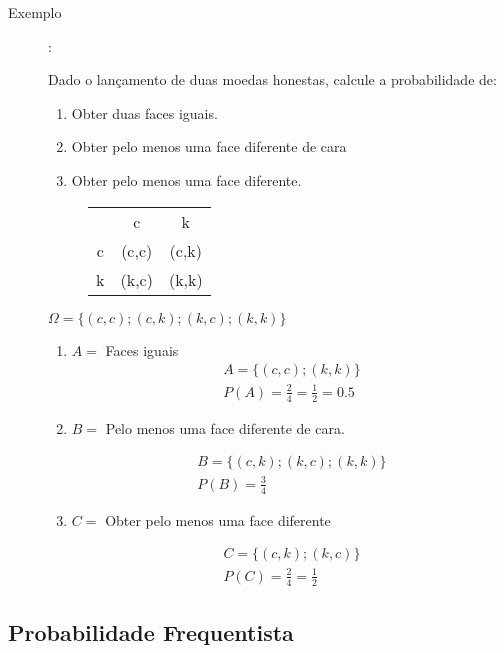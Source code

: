 \documentclass[11pt,a4paper]{book}
\begin{document}
\begin{description}
\item [Exemplo]: 

Dado o lançamento de duas moedas honestas, calcule a probabilidade de: 
\begin{enumerate}[label=(\alph*)]
  \item  Obter duas faces iguais.
  \item Obter pelo menos uma face diferente de cara
  \item  Obter pelo menos uma face diferente.
\end{enumerate}
\begin{figure} [H]
  \centering
  \begin{tabular}{c c c}
    \toprule
    &c&k\\ \cmidrule{2-3}
    c&(c,c)&(c,k)\\ \cmidrule{2-3}
    k&(k,c)&(k,k)\\    \bottomrule
  \end{tabular}
  \label{tab:1}
\end{figure}

$\Omega = \{ (c,c); (c,k) ; (k,c) ; (k,k)\}$
\begin{enumerate}[label=(\alph*)]
  \item $A=$ Faces iguais
    \begin{align*}
      A= \{ (c,c) ; (k,k) \} \\
      P(A) = \frac{2}{4} = \frac{1}{2}= 0.5
    \end{align*}
  \item $B=$ Pelo menos uma face diferente de cara.

    \begin{align*}
      B= \{ (c,k) ; (k,c) ; (k,k) \} \\
      P(B)= \frac{3}{4}
    \end{align*}

  \item $C=$ Obter pelo menos uma face diferente

    \begin{align*}
      C= \{ (c,k) ; (k,c) \} \\
      P(C)= \frac{2}{4}= \frac{1}{2}
    \end{align*}
\end{enumerate}

\end{description}
\subsection{Probabilidade Frequentista}
\end{document}
